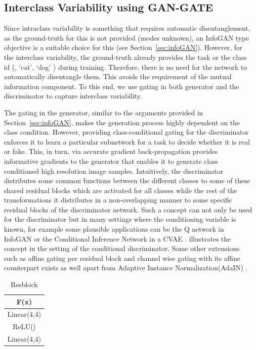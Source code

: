 \subsection{Interclass Variability using GAN-GATE}
\label{sec:interclass}
Since intraclass variability is something that requires automatic disentanglement, as the ground-truth for this is not provided (modes unknown), an InfoGAN type objective is a suitable choice for this (see Section~\ref{sec:infoGAN}). However, for the interclass variability, the ground-truth already provides the task or the class id (\eg, `cat', `dog' \etc) during training. Therefore, there is no need for the network to automatically disentangle them. This avoids the requirement of the mutual information component. To this end, we use gating in both generator and the discriminator to capture interclass variability. 

The gating in the generator, similar to the arguments provided in Section~\ref{sec:infoGAN}, makes the generation process highly dependent on the class condition. However, providing class-conditional gating for the discriminator enforces it to learn a particular subnetwork for a task to decide whether it is real or fake. This, in turn, via accurate gradient back-propagation provides informative gradients to the generator that enables it to generate class conditioned high resolution image samples. Intuitively, the discriminator distributes some common functions between the different classes to some of these shared residual blocks which are activated for all classes while the rest of the transformations it distributes in a non-overlapping manner to some specific residual blocks of the discriminator network. Such a concept can not only be used for the discriminator but in many settings where the conditioning variable is known, for example some plausible applications can be the Q network in InfoGAN\cite{chen2016infogan} or the Conditional Inference Network in a CVAE \cite{sohn2015learning}.  illustrates the concept in the setting of the conditional discriminator. Some other extensions such as affine gating per residual block and channel wise gating with its affine counterpart exists as well apart from Adaptive Instance Normalization(AdaIN) \cite{huang2017arbitrary}.


\begin{table}[ht]
\caption{Resblock} %
\centering %
\begin{tabular}{c} %
\hline\hline %
F(x)\\%
\hline %
Linear(4,4)\\ %
ReLU() \\
Linear(4,4) \\
\hline %
\end{tabular}
\label{table:resblock} %
\end{table}


